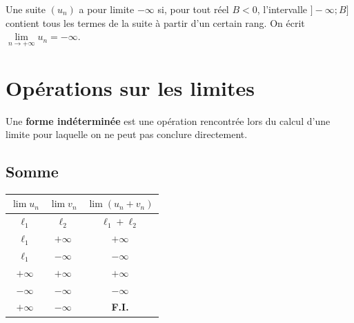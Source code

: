 \documentclass[11pt,a4paper,openany]{book}
\theoremstyle{definition}
\begin{document}
    \begin{center}
    \end{center}

    \begin{Définition}
    Une suite $(u_n)$ a pour limite $-\infty$ si, pour tout réel $B<0$, l'intervalle
    $]-\infty;B]$ contient tous les termes de la suite à partir d'un certain rang.
    On écrit $\lim\limits_{n\to+\infty}u_n=-\infty$.
    \end{Définition}

    \section{Opérations sur les limites}
    \begin{Définition}
    Une \textbf{forme indéterminée} est une opération rencontrée lors du calcul d'une
    limite pour laquelle on ne peut pas conclure directement.
    \end{Définition}

    \subsection{Somme}
    \begin{Propriété}
    \begin{center}
    \begin{tabular}{|c|c|c|}
        \hline
        $\lim u_n$ & $\lim v_n$ & $\lim(u_n+v_n)$ \\
        \hline
        $\ell_1$ & $\ell_2$ & $\ell_1+\ell_2$ \\
        \hline
        $\ell_1$ & $+\infty$ & $+\infty$ \\
        \hline
        $\ell_1$ & $-\infty$ & $-\infty$ \\
        \hline
        $+\infty$ & $+\infty$ & $+\infty$ \\
        \hline
        $-\infty$ & $-\infty$ & $-\infty$ \\
        \hline
        $+\infty$ & $-\infty$ & \textbf{F.I.} \\
        \hline
    \end{tabular}
    \end{center}
    \end{Propriété}
\end{document}

